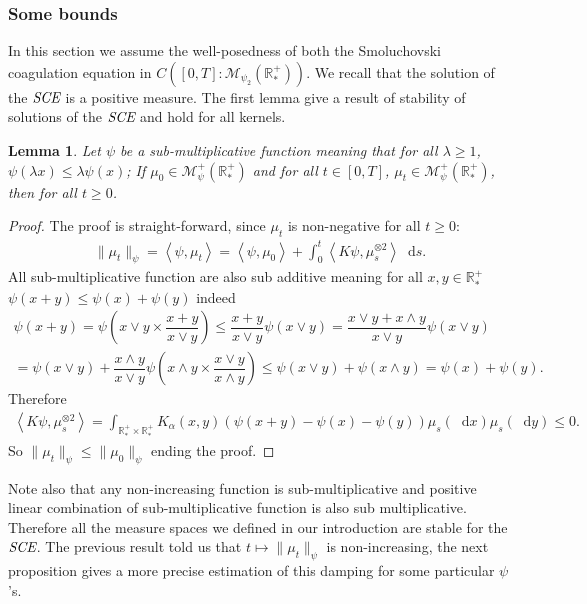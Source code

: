 \documentclass[11pt,a4paper]{article}
\newcommand{\RRP}{\mathbb{R}^+_*}
\newcommand{\MC}{\mathcal{M}}
\newcommand{\SCE}{\emph{SCE}}
\newcommand{\brac}[1]{\left\langle#1\right\rangle}
\newcommand{\dd}{\mathop{}\!\mathrm{d}}
\newtheorem{lemma}[theorem]{Lemma}
\begin{document}
\subsubsection{Some bounds}
In this section we assume the well-posedness of both the Smoluchovski coagulation equation in $C([0,T]: \MC_{\psi_2}(\RRP))$. We recall that the solution of the \(\SCE\) is a positive measure. The first lemma give a result of stability of solutions of the \(\SCE\) and hold for all kernels.
\begin{lemma}\label{lem:sub-add-bounf-smol}
    Let $\psi$ be a sub-multiplicative function meaning that for all $\lambda \geq 1$, $\psi(\lambda x) \leq \lambda \psi(x)$; If $\mu_0 \in \MC^+_{\psi}(\RRP)$ and for all $t\in[0,T]$, $\mu_t \in \MC^+_{\psi}(\RRP)$, then for all $t\geq 0$.
\end{lemma}
\begin{proof}
    The proof is straight-forward, since $\mu_t$ is non-negative for all $t\geq 0$:
    \begin{align*}
        \|\mu_t\|_{\psi} = \brac{\psi,\mu_t} = \brac{\psi,\mu_0} + \int_0^t \brac{K\psi,\mu_s^{\otimes 2}}\dd s.
    \end{align*}
    All sub-multiplicative function are also sub additive meaning for all $x,y \in \RRP$ \(\psi(x+y) \leq \psi(x) + \psi(y)\) indeed
    \begin{multline*}
        \psi(x+y) = \psi\left(x\vee y \times \dfrac{x+y}{x\vee y} \right) \leq \dfrac{x+y}{x\vee y}\psi\left(x\vee y \right) = \dfrac{x\vee y +x\wedge y}{x\vee y}\psi\left(x\vee y \right) \\
         = \psi\left(x\vee y \right) + \dfrac{x\wedge y}{x\vee y} \psi\left(x\wedge  y \times \dfrac{x\vee  y}{x\wedge  y} \right) \leq \psi\left(x\vee y \right) +  \psi\left(x\wedge  y \right) = \psi\left(x \right) +  \psi\left(y \right).
    \end{multline*}
    Therefore
    \begin{align*}
        \brac{K\psi,\mu_s^{\otimes 2}} = \int_{\RRP\times \RRP} K_{\alpha}(x,y) \left(\psi(x+y) - \psi(x) - \psi(y)\right) \mu_s(\dd x) \mu_s (\dd y) \leq 0.
    \end{align*}
    So $ \|\mu_t\|_{\psi} \leq  \|\mu_0\|_{\psi}$ ending the proof.
\end{proof}
Note also that any non-increasing function is sub-multiplicative and positive linear combination of sub-multiplicative function is also sub multiplicative. Therefore all the measure spaces we defined in our introduction are stable for the $\SCE$. The previous result told us that $t \mapsto \|\mu_t\|_{\psi}$ is non-increasing, the next proposition gives a more precise estimation of this damping for some particular $\psi$'s. 
\end{document}
